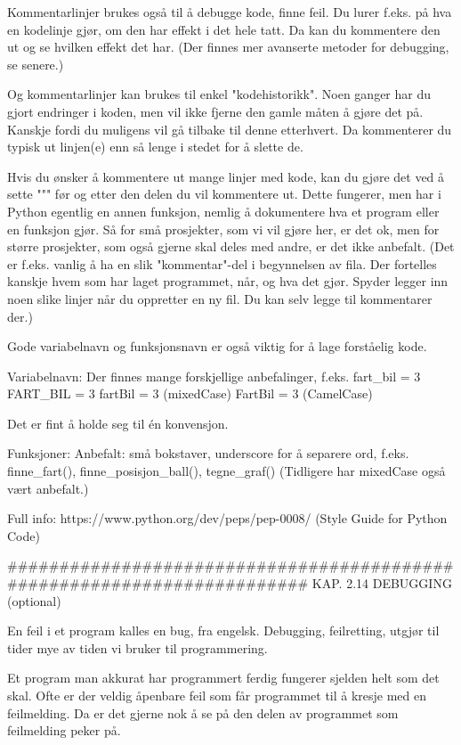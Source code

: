 {Kommentarlinjer brukes også til å debugge kode, finne feil.
Du lurer f.eks. på hva en kodelinje gjør, om den har effekt i det hele tatt.
Da kan du kommentere den ut og se hvilken effekt det har.
(Der finnes mer avanserte metoder for debugging, se senere.)

Og kommentarlinjer kan brukes til enkel "kodehistorikk". 
Noen ganger har du gjort endringer i koden, men vil ikke fjerne den gamle måten
å gjøre det på. Kanskje fordi du muligens vil gå tilbake til denne etterhvert.
Da kommenterer du typisk ut linjen(e) enn så lenge i stedet for å slette de. 


Hvis du ønsker å kommentere ut mange linjer med kode,
kan du gjøre det ved å sette """ før og etter den delen du vil kommentere ut.
Dette fungerer, men har i Python egentlig en annen funksjon, nemlig å dokumentere
hva et program eller en funksjon gjør.
Så for små prosjekter, som vi vil gjøre her, er det ok, men for større prosjekter, 
som også gjerne skal deles med andre, er det ikke anbefalt. 
(Det er f.eks. vanlig å ha en slik "kommentar"-del i begynnelsen av fila.
Der fortelles kanskje hvem som har laget programmet, når, og hva det gjør.
Spyder legger inn noen slike linjer når du oppretter en ny fil.
Du kan selv legge til kommentarer der.) 


Gode variabelnavn og funksjonsnavn er også viktig for å lage forståelig kode.

Variabelnavn: 
Der finnes mange forskjellige anbefalinger, f.eks. 
fart_bil = 3
FART_BIL = 3
fartBil = 3 (mixedCase)
FartBil = 3 (CamelCase)

Det er fint å holde seg til én konvensjon. 


Funksjoner:
Anbefalt: små bokstaver, underscore for å separere ord, f.eks.
finne_fart(), finne_posisjon_ball(), tegne_graf()
(Tidligere har mixedCase også vært anbefalt.) 


Full info: https://www.python.org/dev/peps/pep-0008/ (Style Guide for Python Code) 

######################################################################## 
KAP. 2.14  DEBUGGING  (optional)

En feil i et program kalles en bug, fra engelsk. 
Debugging, feilretting, utgjør til tider mye av tiden vi bruker til programmering. 

Et program man akkurat har programmert ferdig fungerer sjelden helt som det skal.
Ofte er der veldig åpenbare feil som får programmet til å kresje med en feilmelding.
Da er det gjerne nok å se på den delen av programmet som feilmelding peker på. 

}
